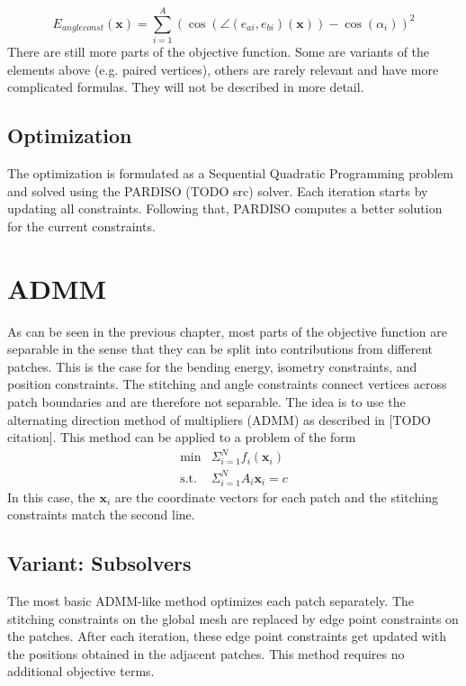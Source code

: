 \documentclass[a4paper,twoside,12pt,nochapterprefix]{scrbook}
\begin{document}
\begin{equation}
E_{angleconst}(\mathbf{x}) = \sum_{i = 1}^A (\cos( \angle(e_{ai}, e_{bi})(\mathbf{x})) - \cos(\alpha_i ))^2
\end{equation}
There are still more parts of the objective function. Some are variants of the elements above (e.g. paired vertices), others are rarely relevant and have more complicated formulas. They will not be described in more detail.\newline
\section{Optimization}
The optimization is formulated as a Sequential Quadratic Programming problem and solved using the PARDISO (TODO src) solver. Each iteration starts by updating all constraints. Following that, PARDISO computes a better solution for the current constraints.
\chapter{ADMM}\label{sec:admm}
As can be seen in the previous chapter, most parts of the objective function are separable in the sense that they can be split into contributions from different patches. This is the case for the bending energy, isometry constraints, and position constraints. The stitching and angle constraints connect vertices across patch boundaries and are therefore not separable.\newline
The idea is to use the alternating direction method of multipliers (ADMM) as described in [TODO citation]. This method can be applied to a problem of the form
\begin{equation}
\begin{array}{lr}
\mbox{min} & \Sigma_{i=1}^{N} f_i(\mathbf{x}_i) \\
\mbox{s.t.} & \Sigma_{i=1}^{N} A_i \mathbf{x}_i = c
\end{array}
\end{equation}
In this case, the $\mathbf{x}_i$ are the coordinate vectors for each patch and the stitching constraints match the second line.\newline
\section{Variant: Subsolvers}
The most basic ADMM-like method optimizes each patch separately. The stitching constraints on the global mesh are replaced by edge point constraints on the patches. After each iteration, these edge point constraints get updated with the positions obtained in the adjacent patches. This method requires no additional objective terms.\newline
\end{document}
